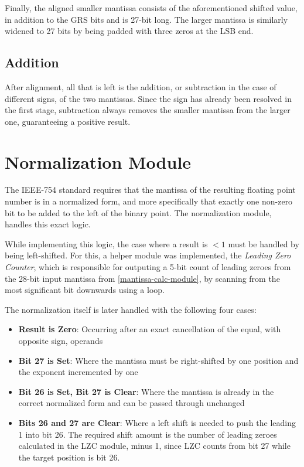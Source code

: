 \documentclass[12pt]{report}
\begin{document}
\noindent Finally, the aligned smaller mantissa consists of the aforementioned shifted value, in addition to the GRS bits and is 27-bit long. The larger mantissa is similarly widened to 27 bits by being padded with three zeros at the LSB end.

\subsection{Addition}
After alignment, all that is left is the addition, or subtraction in the case of different signs, of the two mantissas. Since  the sign has already been resolved in the first stage, subtraction always removes the smaller mantissa from the larger one, guaranteeing a positive result.
 
\section{Normalization Module}
The IEEE-754 standard requires that the mantissa of the resulting floating point number is in a normalized form, and more specifically that exactly one non-zero bit to be added to the left of the binary point. The normalization module, handles this exact logic.

\noindent While implementing this logic, the case where a result is $< 1$ must be handled by being left-shifted. For this, a helper module was implemented, the \textit{Leading Zero Counter}, which is responsible for outputing a 5-bit count of leading zeroes from the 28-bit input mantissa from \ref{mantissa-calc-module}, by scanning from the most significant bit downwards using a loop.

\noindent The normalization itself is later handled with the following four cases:
\begin{itemize}
    \item \textbf{Result is Zero}: Occurring after an exact cancellation of the equal, with opposite sign, operands
    \item \textbf{Bit 27 is Set}: Where the mantissa must be right-shifted by one position and the exponent incremented by one
    \item \textbf{Bit 26 is Set, Bit 27 is Clear}: Where the mantissa is already in the correct normalized form and can be passed through unchanged
    \item \textbf{Bits 26 and 27 are Clear}: Where a left shift is needed to push the leading 1 into bit 26. The required shift amount is the number of leading zeroes calculated in the LZC module, minus 1, since LZC counts from bit 27 while the target position is bit 26. 
\end{itemize}
\end{document}
